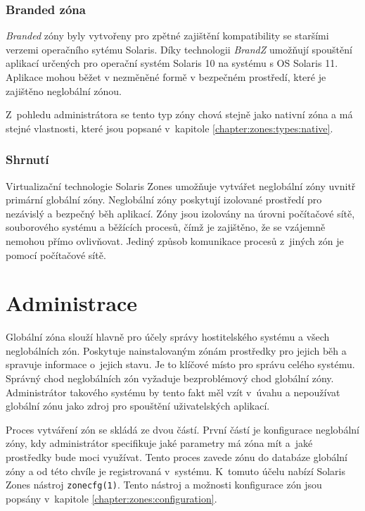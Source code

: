 \subsubsection{Branded zóna}
\label{chapter:zones:types:branded}
\textit{Branded} zóny byly vytvořeny pro zpětné zajištění kompatibility se staršími verzemi operačního sytému Solaris. Díky technologii
\textit{BrandZ} \cite{oracle:solaris:zones:brands} umožňují spouštění aplikací určených pro operační systém Solaris 10 na 
systému s OS Solaris 11. Aplikace mohou běžet v nezměněné formě v bezpečném prostředí, které je zajištěno neglobální zónou.

Z~pohledu administrátora se tento typ zóny chová stejně jako nativní zóna a má stejné vlastnosti, které jsou popsané
v~kapitole \ref{chapter:zones:types:native}.
\subsubsection{Shrnutí}
\label{chapter:zones:summary}
Virtualizační technologie Solaris Zones umožňuje vytvářet neglobální zóny uvnitř primární globální zóny. Neglobální zóny
poskytují izolované prostředí pro nezávislý a bezpečný běh aplikací. Zóny jsou izolovány na úrovni počítačové sítě,
souborového systému a běžících procesů, čímž je zajištěno, že se vzájemně nemohou přímo ovlivňovat. Jediný způsob komunikace
procesů z~jiných zón je pomocí počítačové sítě.
\section{Administrace}
\label{chapter:zones:administration}
Globální zóna slouží hlavně pro účely správy hostitelského systému a všech neglobálních zón. Poskytuje nainstalovaným zónám
prostředky pro jejich běh a spravuje informace o~jejich stavu. Je to klíčové místo pro správu celého systému. Správný chod
neglobálních zón vyžaduje bezproblémový chod globální zóny. Administrátor takového systému by tento fakt měl vzít v~úvahu a
nepoužívat globální zónu jako zdroj pro spouštění uživatelských aplikací.

Proces vytváření zón se skládá ze dvou částí. První částí je konfigurace neglobální zóny, kdy administrátor specifikuje jaké
parametry má zóna mít a~jaké prostředky bude moci využívat. Tento proces zavede zónu do databáze globální zóny a od této
chvíle je registrovaná v~systému. K~tomuto účelu nabízí Solaris Zones nástroj \verb|zonecfg(1)|. Tento nástroj a
možnosti konfigurace zón jsou popsány v~kapitole \ref{chapter:zones:configuration}.

